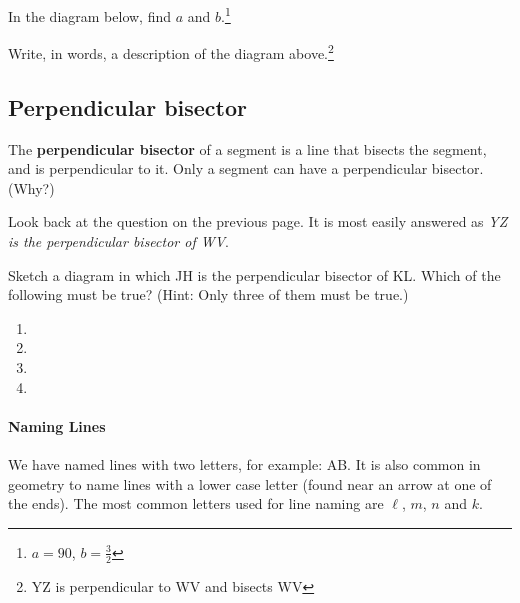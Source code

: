 \smallskip

\noindent \q In the diagram below, find $a$ and $b$.\footnote{$a=90$, $b=\frac{3}{2}$}\\

	
\noindent \q Write, in words, a description of the diagram above.\footnote{\seg YZ is perpendicular to  \seg WV and bisects  \seg WV}

\medskip
\newpage

\subsection{Perpendicular bisector}
\label{sec:perp-bis}

The \textbf{perpendicular bisector} of a segment is a line that bisects the segment, and is perpendicular to it. \q Only a segment can have a perpendicular bisector. (Why?)

Look back at the question on the previous page.  It is most easily answered as
\emph{\seg YZ is the perpendicular bisector of \seg WV}.

\noindent \q Sketch a diagram in which \seg JH is the perpendicular bisector of \seg KL.  Which of the following must be true?  (Hint: Only three of them must be true.)

\begin{enumerate}
\item {}
\item {}
\item {}
\item {}
\end{enumerate}

\paragraph{Naming Lines}
We have named lines with two letters, for example: \lin AB.  It is also common in geometry to name lines with a lower case letter (found near an arrow at one of the ends).  The most common letters used for line naming are $\ell$, $m$, $n$ and $k$.

